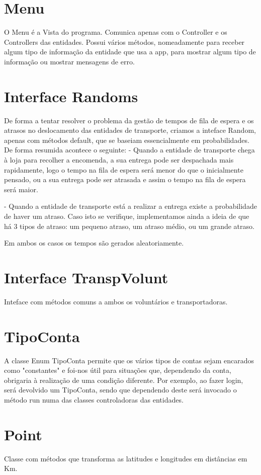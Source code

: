 \documentclass[a4paper]{report}
\begin{document}
	\section{Menu}
	O Menu é a Vista do programa. Comunica apenas com o Controller e os Controllers das entidades.
	Possui vários métodos, nomeadamente para receber algum tipo de informação da entidade que usa a app, para mostrar algum tipo de informação ou mostrar mensagens de erro.
	
	\section{Interface Randoms}
	De forma a tentar resolver o problema da gestão de tempos de fila de espera e os atrasos no deslocamento das entidades de transporte, criamos a inteface Random, apenas com métodos default, que se baseiam essencialmente em probabilidades.
	De forma resumida acontece o seguinte:
	 - Quando a entidade de transporte chega à loja para recolher a encomenda, a sua entrega pode ser despachada mais rapidamente, logo o tempo na fila de espera será menor do que o inicialmente pensado, ou a sua entrega pode ser atrasada e assim o tempo na fila de espera será maior.
	 
	 - Quando a entidade de transporte está a realizar a entrega existe a probabilidade de haver um atraso. Caso isto se verifique, implementamos ainda a ideia de que há 3 tipos de atraso: um pequeno atraso, um atraso médio, ou um grande atraso.
	 
	 Em ambos os casos os tempos são gerados aleatoriamente. 
	 
	  \section{Interface TranspVolunt}
	 Inteface com métodos comuns a ambos os voluntários e transportadoras.
	 
	 \section{TipoConta}
	 A classe Enum TipoConta permite que os vários tipos de contas sejam encarados como "constantes" e foi-nos útil para situações que, dependendo da conta, obrigaria à realização de uma condição diferente. Por exemplo, ao fazer login, será devolvido um TipoConta, sendo que dependendo deste será invocado o método run numa das classes controladoras das entidades.
	 
	\section{Point}
	Classe com métodos que transforma as latitudes e longitudes em distâncias em Km.
\end{document}
